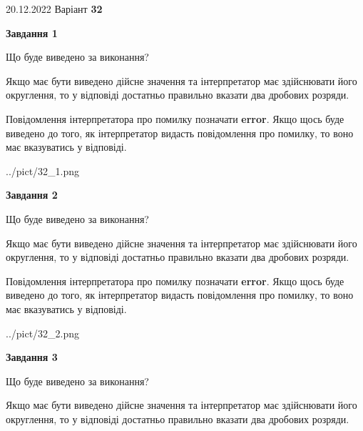 \documentclass[12pt, ukrainian]{article}
\begin{document}
{20.12.2022 Варіант \No \textbf { 32 }\par}
{
\begin {Large}

{\begin {center}\textbf{Завдання 1}\end {center}}\par
Що буде виведено за виконання? \par

Якщо має бути виведено дійсне значення та інтерпретатор має здійснювати його округлення, 
то у відповіді достатньо правильно вказати два дробових розряди.

Повідомлення інтерпретатора про помилку позначати \textbf{error}.
Якщо щось буде виведено до того, як інтерпретатор видасть повідомлення про помилку, 
то воно має вказуватись у відповіді. \par

\begin{center}
	{../pict/32_1.png}
\end{center}
\newpage

{\begin {center}\textbf{Завдання 2}\end {center}}\par
Що буде виведено за виконання? \par

Якщо має бути виведено дійсне значення та інтерпретатор має здійснювати його округлення, 
то у відповіді достатньо правильно вказати два дробових розряди.

Повідомлення інтерпретатора про помилку позначати \textbf{error}.
Якщо щось буде виведено до того, як інтерпретатор видасть повідомлення про помилку, 
то воно має вказуватись у відповіді. \par

\begin{center}
	{../pict/32_2.png}
\end{center}
\newpage

{\begin {center}\textbf{Завдання 3}\end {center}}\par
Що буде виведено за виконання? \par

Якщо має бути виведено дійсне значення та інтерпретатор має здійснювати його округлення, 
то у відповіді достатньо правильно вказати два дробових розряди.


\end{Large}}
\end{document}
